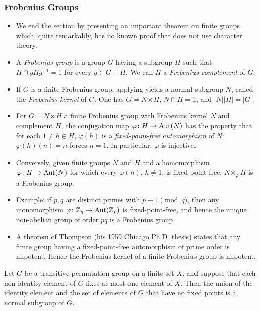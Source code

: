 \documentclass[../Odyssey_Project.tex]{subfiles}
\begin{document}
\subsubsection*{Frobenius Groups}
\begin{itemize}
    \item We end the section by presenting an important theorem on finite groups which, quite remarkably, has no known proof that does not use character theory.
    \item A \emph{Frobenius group} is a group $G$ having a subgroup $H$ such that $H \cap g H g^{-1} = 1$ for every $g \in G - H$. We call $H$ a \emph{Frobenius complement} of $G$.
    \item If $G$ is a finite Frobenius group, applying  yields a normal subgroup $N$, called the \emph{Frobenius kernel} of $G$. One has $G = N \rtimes H$, $N \cap H = 1$, and $|N||H| = |G|$.
    \item For $G = N \rtimes H$ a finite Frobenius group with Frobenius kernel $N$ and complement $H$, the conjugation map $\varphi \colon H \to \operatorname{Aut}(N)$ has the property that for each $1 \neq h \in H$, $\varphi(h)$ is a \emph{fixed-point-free automorphism} of $N$: $\varphi(h)(n) = n$ forces $n = 1$. In particular, $\varphi$ is injective.
    \item Conversely, given finite groups $N$ and $H$ and a homomorphism $\varphi \colon H \to \operatorname{Aut}(N)$ for which every $\varphi(h)$, $h \neq 1$, is fixed-point-free, $N \rtimes_\varphi H$ is a Frobenius group.
    \item Example: if $p, q$ are distinct primes with $p \equiv 1 \pmod{q}$, then any monomorphism $\varphi \colon \mathbb{Z}_q \to \operatorname{Aut}(\mathbb{Z}_p)$ is fixed-point-free, and hence the unique non-abelian group of order $pq$ is a Frobenius group.
    \item A theorem of Thompson (his 1959 Chicago Ph.D. thesis) states that any finite group having a fixed-point-free automorphism of prime order is nilpotent. Hence the Frobenius kernel of a finite Frobenius group is nilpotent.
\end{itemize}

\begin{namedtheorem}
\label{thm:frobenius}
Let $G$ be a transitive permutation group on a finite set $X$, and suppose that each non-identity element of $G$ fixes at most one element of $X$. Then the union of the identity element and the set of elements of $G$ that have no fixed points is a normal subgroup of $G$.
\end{namedtheorem}
\end{document}
